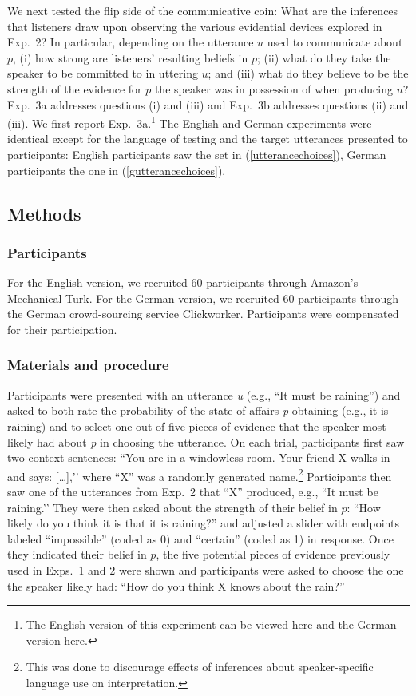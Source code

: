 \documentclass[11pt]{article}
\newcommand{\eref}[1]{(\ref{#1})}
\begin{document}
We next tested the flip side of the communicative coin: What are the inferences that listeners draw upon observing the various evidential devices explored in Exp.~2? In particular, depending on the utterance $u$ used to communicate about $p$, (i) how strong are listeners' resulting beliefs in $p$; (ii) what do they take the speaker to be committed to in uttering $u$; and (iii)  what do they believe to be the strength of the evidence for $p$ the speaker was in possession of when producing $u$? Exp.~3a addresses questions (i) and (iii) and Exp.~3b addresses questions (ii) and (iii). We first report Exp.~3a.\footnote{The English version of this experiment can be viewed \href{http://stanford.edu/~jdegen/72_modals_comprehension_evidence_room/modals.html}{here} and the German version \href{http://web.stanford.edu/~jdegen/cgi-bin/2_dp_comprehension_listenerbelief/modals.html}{here}.} The English and German experiments were identical except for the language of testing and the target utterances presented to participants: English participants saw the set in \eref{utterancechoices},  German participants the one in \eref{gutterancechoices}.

\subsection{Methods}

\subsubsection{Participants}

For the English version, we recruited 60 participants through Amazon's Mechanical Turk. 
For the German version, we recruited 60 participants through the German crowd-sourcing service Clickworker. Participants were compensated for their participation.

\subsubsection{Materials and procedure}

Participants were presented with an utterance \emph{u} (e.g., ``It must be raining'') and asked to both rate the probability of the state of affairs \emph{p} obtaining (e.g., it is raining) and to select one out of five pieces of evidence that the speaker most likely had about \emph{p} in choosing the utterance. On each trial, participants first saw two context sentences: ``You are in a windowless room. Your friend X walks in and says: […],’’ where ``X'' was a randomly generated name.\footnote{This was done to discourage effects of inferences about speaker-specific language use on interpretation.} Participants then saw one of the utterances from Exp.~2 that ``X'' produced, e.g., ``It must be raining.’’ They were then asked about the strength of their belief in $p$: ``How likely do you think it is that it is raining?'' and adjusted a slider with endpoints labeled ``impossible'' (coded as 0) and ``certain'' (coded as 1) in response. Once they indicated their belief in $p$, the five potential pieces of evidence previously used in Exps.~1 and 2 were shown and participants were asked to choose the one the speaker likely had: ``How do you think X knows about the rain?'' 
\end{document}

